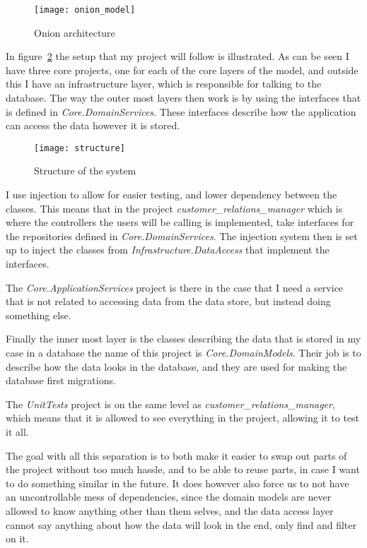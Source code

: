 \begin{figure}[h]
  \centering
  \texttt{[image: onion\_model]}
  \caption[Onion architecture]{Onion architecture\protect\footnotemark}
  \label{fig:Onion architecture}
\end{figure}

In figure~\ref{fig:structure} the setup that my project will follow is
illustrated. As can be seen I have three core projects, one for each of the core
layers of the model, and outside this I have an infrastructure layer, which is
responsible for talking to the database. The way the outer most layers then work
is by using the interfaces that is defined in \textit{Core.DomainServices}.
These interfaces describe how the application can access the data however it is
stored. 

\begin{figure}[h]
  \centering
  \texttt{[image: structure]}
  \caption{Structure of the system}
  \label{fig:structure}
\end{figure}

I use injection to allow for easier testing, and lower dependency between the
classes. This means that in the project \textit{customer\_relations\_manager}
which is where the controllers the users will be calling is implemented, take
interfaces for the repositories defined in \textit{Core.DomainServices}. The
injection system then is set up to inject the classes from
\textit{Infrastructure.DataAccess} that implement the interfaces. 

The \textit{Core.ApplicationServices} project is there in the case that I need a
service that is not related to accessing data from the data store, but instead
doing something else. 

Finally the inner most layer is the classes describing the data that is stored
in my case in a database the name of this project is \textit{Core.DomainModels}.
Their job is to describe how the data looks in the database, and they are used
for making the database first migrations. 

The \textit{UnitTests} project is on the same level as
\textit{customer\_relations\_manager}, which means that it is allowed to see
everything in the project, allowing it to test it all. 

The goal with all this separation is to both make it easier to swap out parts of
the project without too much hassle, and to be able to reuse parts, in case I
want to do something similar in the future. It does however also force us to not
have an uncontrollable mess of dependencies, since the domain models are never
allowed to know anything other than them selves, and the data access layer
cannot say anything about how the data will look in the end, only find and
filter on it. 

